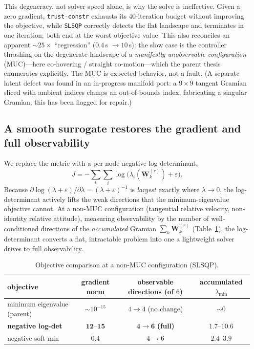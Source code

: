 \documentclass[11pt]{article}
\newcommand{\stlog}{\mathbf{W}^{(r)}}
\begin{document}
This degeneracy, not solver speed alone, is why the solve is ineffective. Given a zero
gradient, \texttt{trust-constr} exhausts its $40$-iteration budget without improving the
objective, while \texttt{SLSQP} correctly detects the flat landscape and terminates in one
iteration; both end at the worst objective value. This also reconciles an apparent
${\sim}25\times$ ``regression'' ($0.4$\,s $\to 10$\,s): the slow case is the controller
thrashing on the degenerate landscape of a \emph{manifestly unobservable configuration}
(MUC)---here co-hovering / straight co-motion---which the parent thesis enumerates explicitly.
The MUC is expected behavior, not a fault. (A separate latent defect was found in an
in-progress manifold port: a $9\times9$ tangent Gramian sliced with ambient indices clamps an
out-of-bounds index, fabricating a singular Gramian; this has been flagged for repair.)

\subsection{A smooth surrogate restores the gradient and full observability}

We replace the metric with a per-node negative log-determinant,
\begin{equation}
J = -\sum_k \sum_i \log\!\big(\lambda_i(\stlog_k)+\varepsilon\big).
\label{eq:logdet}
\end{equation}
Because $\partial\log(\lambda+\varepsilon)/\partial\lambda=(\lambda+\varepsilon)^{-1}$ is
\emph{largest} exactly where $\lambda\to0$, the log-determinant actively lifts the weak
directions that the minimum-eigenvalue objective cannot. At a non-MUC configuration
(tangential relative velocity, non-identity relative attitude), measuring observability by the
number of well-conditioned directions of the \emph{accumulated} Gramian $\sum_k\stlog_k$
(Table~\ref{tab:objectives}), the log-determinant converts a flat, intractable problem into
one a lightweight solver drives to full observability.

\begin{table}[h]
\centering
\caption{Objective comparison at a non-MUC configuration (SLSQP).}
\label{tab:objectives}
\begin{tabular}{lccc}
\toprule
objective & gradient norm & observable directions (of $6$) & accumulated $\lambda_{\min}$ \\
\midrule
minimum eigenvalue (parent) & ${\sim}10^{-15}$ & $4 \to 4$ (no change) & ${\sim}0$ \\
\textbf{negative log-det} & $\mathbf{12\text{--}15}$ & $\mathbf{4 \to 6}$ \textbf{(full)} & $\mathbf{1.7\text{--}10.6}$ \\
negative soft-min & $0.4$ & $4 \to 6$ & $2.4\text{--}3.9$ \\
\bottomrule
\end{tabular}
\end{table}
\end{document}
